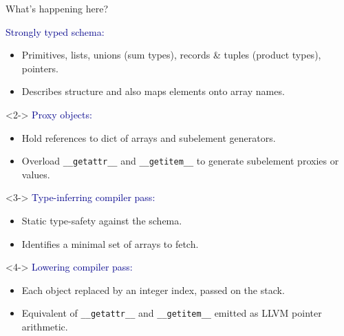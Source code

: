 \documentclass[aspectratio=169]{beamer}
\begin{document}
\begin{frame}{What's happening here?}
\vspace{0.4 cm}

\textcolor{darkblue}{\large Strongly typed schema:}
\begin{itemize}
\item Primitives, lists, unions (sum types), records \& tuples (product types), pointers.
\item Describes structure and also maps elements onto array names.
\end{itemize}

\vspace{0.25 cm}
\begin{uncoverenv}<2->
\textcolor{darkblue}{\large Proxy objects:}
\begin{itemize}
\item Hold references to dict of arrays and subelement generators.
\item Overload {\tt\small \_\_getattr\_\_} and {\tt\small \_\_getitem\_\_} to generate subelement proxies or values.
\end{itemize}
\end{uncoverenv}

\begin{uncoverenv}<3->
\vspace{0.25 cm}
\textcolor{darkblue}{\large Type-inferring compiler pass:}
\begin{itemize}
\item Static type-safety against the schema.
\item Identifies a minimal set of arrays to fetch.
\end{itemize}
\end{uncoverenv}

\begin{uncoverenv}<4->
\vspace{0.25 cm}
\textcolor{darkblue}{\large Lowering compiler pass:}
\begin{itemize}
\item Each object replaced by an integer index, passed on the stack.
\item Equivalent of {\tt\small \_\_getattr\_\_} and {\tt\small \_\_getitem\_\_} emitted as LLVM pointer arithmetic.
\end{itemize}
\end{uncoverenv}
\end{frame}
\end{document}
